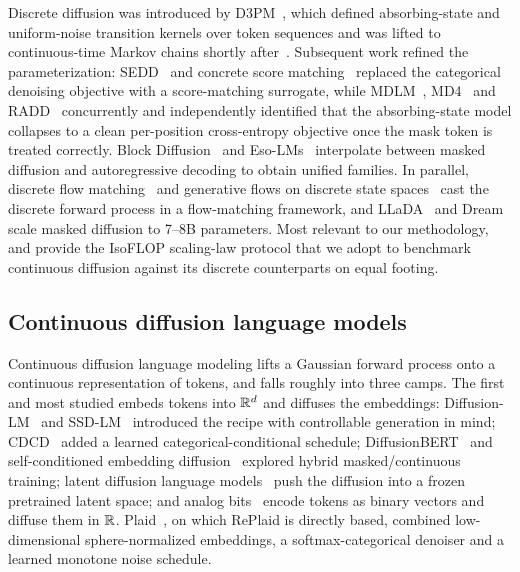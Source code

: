 \documentclass{article}
\begin{document}
Discrete diffusion was introduced by D3PM~\citep{austin2021structured}, which defined absorbing-state and uniform-noise transition kernels over token sequences and was lifted to continuous-time Markov chains shortly after~\citep{campbell2022continuous}. Subsequent work refined the parameterization: SEDD~\citep{lou2024discrete} and concrete score matching~\citep{meng2022concrete} replaced the categorical denoising objective with a score-matching surrogate, while MDLM~\citep{sahoo2024simple}, MD4~\citep{shi2024simplified} and RADD~\citep{ou2025your} concurrently and independently identified that the absorbing-state model collapses to a clean per-position cross-entropy objective once the mask token is treated correctly. Block Diffusion~\citep{arriola2025block} and Eso-LMs~\citep{sahoo2025esoteric} interpolate between masked diffusion and autoregressive decoding to obtain unified families. In parallel, discrete flow matching~\citep{gat2024discrete} and generative flows on discrete state spaces~\citep{campbell2024generative} cast the discrete forward process in a flow-matching framework, and LLaDA~\citep{nie2025large} and Dream~\citep{ye2025dream} scale masked diffusion to 7--8B parameters. Most relevant to our methodology, \citet{nie2025scaling} and \citet{sahoo2026scaling} provide the IsoFLOP scaling-law protocol that we adopt to benchmark continuous diffusion against its discrete counterparts on equal footing.

\subsection{Continuous diffusion language models}

Continuous diffusion language modeling lifts a Gaussian forward process onto a continuous representation of tokens, and falls roughly into three camps. The first and most studied embeds tokens into $\mathbb{R}^d$ and diffuses the embeddings: Diffusion-LM~\citep{li2022diffusion} and SSD-LM~\citep{han2022ssd} introduced the recipe with controllable generation in mind; CDCD~\citep{dieleman2022continuous} added a learned categorical-conditional schedule; DiffusionBERT~\citep{he2022diffusionbert} and self-conditioned embedding diffusion~\citep{strudel2022self} explored hybrid masked/continuous training; latent diffusion language models~\citep{lovelace2023latent} push the diffusion into a frozen pretrained latent space; and analog bits~\citep{chen2023analog} encode tokens as binary vectors and diffuse them in $\mathbb{R}$. Plaid~\citep{gulrajani2023plaid}, on which RePlaid is directly based, combined low-dimensional sphere-normalized embeddings, a softmax-categorical denoiser and a learned monotone noise schedule.
\end{document}
